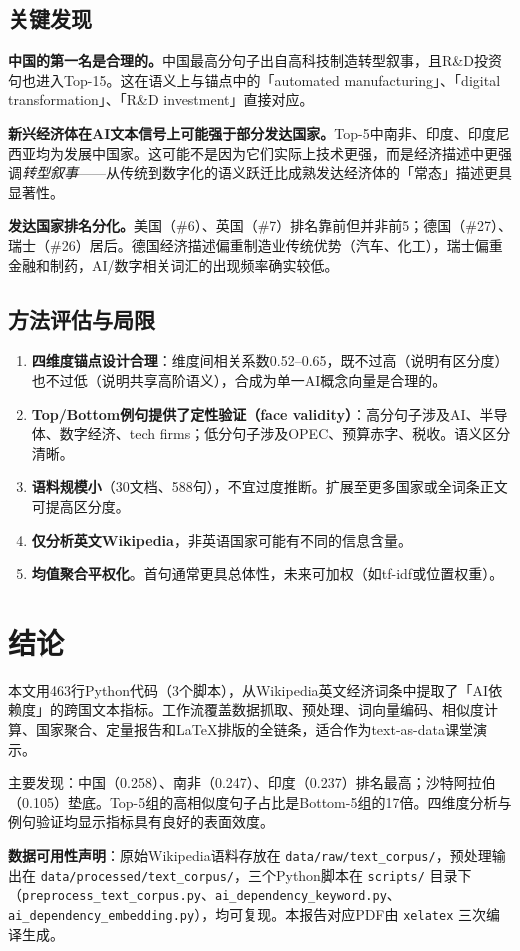 \documentclass[11pt,a4paper]{article}
\begin{document}
\subsection{关键发现}
\textbf{中国的第一名是合理的。}中国最高分句子出自高科技制造转型叙事，且R\&D投资句也进入Top-15。这在语义上与锚点中的「automated manufacturing」、「digital transformation」、「R\&D investment」直接对应。

\textbf{新兴经济体在AI文本信号上可能强于部分发达国家。}Top-5中南非、印度、印度尼西亚均为发展中国家。这可能不是因为它们实际上技术更强，而是经济描述中更强调\emph{转型叙事}——从传统到数字化的语义跃迁比成熟发达经济体的「常态」描述更具显著性。

\textbf{发达国家排名分化。}美国（\#6）、英国（\#7）排名靠前但并非前5；德国（\#27）、瑞士（\#26）居后。德国经济描述偏重制造业传统优势（汽车、化工），瑞士偏重金融和制药，AI/数字相关词汇的出现频率确实较低。

\subsection{方法评估与局限}
\begin{enumerate}[nosep]
\item \textbf{四维度锚点设计合理}：维度间相关系数0.52--0.65，既不过高（说明有区分度）也不过低（说明共享高阶语义），合成为单一AI概念向量是合理的。
\item \textbf{Top/Bottom例句提供了定性验证（face validity）}：高分句子涉及AI、半导体、数字经济、tech firms；低分句子涉及OPEC、预算赤字、税收。语义区分清晰。
\item \textbf{语料规模小}（30文档、588句），不宜过度推断。扩展至更多国家或全词条正文可提高区分度。
\item \textbf{仅分析英文Wikipedia}，非英语国家可能有不同的信息含量。
\item \textbf{均值聚合平权化}。首句通常更具总体性，未来可加权（如tf-idf或位置权重）。
\end{enumerate}

\section{结论}

本文用463行Python代码（3个脚本），从Wikipedia英文经济词条中提取了「AI依赖度」的跨国文本指标。工作流覆盖数据抓取、预处理、词向量编码、相似度计算、国家聚合、定量报告和LaTeX排版的全链条，适合作为text-as-data课堂演示。

主要发现：中国（0.258）、南非（0.247）、印度（0.237）排名最高；沙特阿拉伯（0.105）垫底。Top-5组的高相似度句子占比是Bottom-5组的17倍。四维度分析与例句验证均显示指标具有良好的表面效度。

\vspace{0.5cm}
\noindent\textbf{数据可用性声明}：原始Wikipedia语料存放在 \texttt{data/raw/text\_corpus/}，预处理输出在 \texttt{data/processed/text\_corpus/}，三个Python脚本在 \texttt{scripts/} 目录下（\texttt{preprocess\_text\_corpus.py}、\texttt{ai\_dependency\_keyword.py}、\texttt{ai\_dependency\_embedding.py}），均可复现。本报告对应PDF由 \texttt{xelatex} 三次编译生成。
\end{document}
